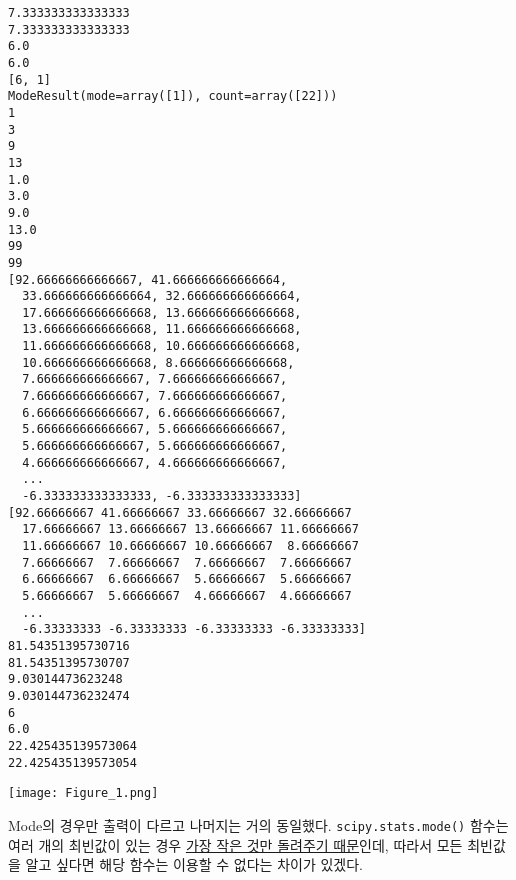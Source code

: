 \documentclass[a4paper,11pt]{scrartcl}
\begin{document}
\begin{lstlisting}
7.333333333333333
7.333333333333333
6.0
6.0
[6, 1]
ModeResult(mode=array([1]), count=array([22]))
1
3
9
13
1.0
3.0
9.0
13.0
99
99
[92.66666666666667, 41.666666666666664,
  33.666666666666664, 32.666666666666664,
  17.666666666666668, 13.666666666666668,
  13.666666666666668, 11.666666666666668,
  11.666666666666668, 10.666666666666668,
  10.666666666666668, 8.666666666666668,
  7.666666666666667, 7.666666666666667,
  7.666666666666667, 7.666666666666667,
  6.666666666666667, 6.666666666666667,
  5.666666666666667, 5.666666666666667,
  5.666666666666667, 5.666666666666667,
  4.666666666666667, 4.666666666666667,
  ...
  -6.333333333333333, -6.333333333333333]
[92.66666667 41.66666667 33.66666667 32.66666667
  17.66666667 13.66666667 13.66666667 11.66666667
  11.66666667 10.66666667 10.66666667  8.66666667
  7.66666667  7.66666667  7.66666667  7.66666667
  6.66666667  6.66666667  5.66666667  5.66666667
  5.66666667  5.66666667  4.66666667  4.66666667
  ...
  -6.33333333 -6.33333333 -6.33333333 -6.33333333]
81.54351395730716
81.54351395730707
9.03014473623248
9.030144736232474
6
6.0
22.425435139573064
22.425435139573054
\end{lstlisting}

\begin{center}
  \texttt{[image: Figure\_1.png]}
\end{center}

Mode의 경우만 출력이 다르고 나머지는 거의 동일했다. \lstinline{scipy.stats.mode()} 함수는 여러 개의 최빈값이 있는 경우 \href{https://docs.scipy.org/doc/scipy/reference/generated/scipy.stats.mode.html}{가장 작은 것만 돌려주기 때문}인데, 따라서 모든 최빈값을 알고 싶다면 해당 함수는 이용할 수 없다는 차이가 있겠다.
\end{document}
